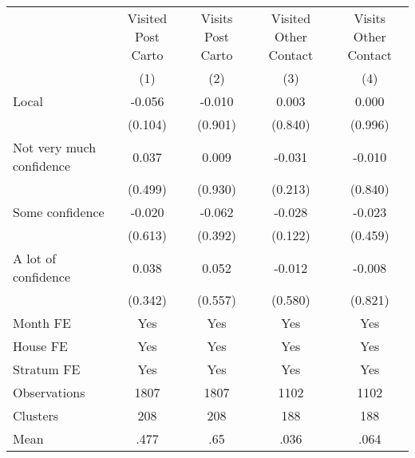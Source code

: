 {
\def\sym#1{\ifmmode^{#1}\else\(^{#1}\)\fi}
\begin{tabular}{l*{4}{c}}
\toprule
                &\multicolumn{1}{c}{Visited Post Carto}&\multicolumn{1}{c}{Visits Post Carto}&\multicolumn{1}{c}{Visited Other Contact}&\multicolumn{1}{c}{Visits Other Contact}\\
                &\multicolumn{1}{c}{(1)}         &\multicolumn{1}{c}{(2)}         &\multicolumn{1}{c}{(3)}         &\multicolumn{1}{c}{(4)}         \\
\midrule
Local           &   -0.056         &   -0.010         &    0.003         &    0.000         \\
                &  (0.104)         &  (0.901)         &  (0.840)         &  (0.996)         \\
Not very much confidence&    0.037         &    0.009         &   -0.031         &   -0.010         \\
                &  (0.499)         &  (0.930)         &  (0.213)         &  (0.840)         \\
Some confidence &   -0.020         &   -0.062         &   -0.028         &   -0.023         \\
                &  (0.613)         &  (0.392)         &  (0.122)         &  (0.459)         \\
A lot of confidence&    0.038         &    0.052         &   -0.012         &   -0.008         \\
                &  (0.342)         &  (0.557)         &  (0.580)         &  (0.821)         \\
Month FE        &      Yes         &      Yes         &      Yes         &      Yes         \\
House FE        &      Yes         &      Yes         &      Yes         &      Yes         \\
Stratum FE      &      Yes         &      Yes         &      Yes         &      Yes         \\
\midrule
Observations    &     1807         &     1807         &     1102         &     1102         \\
Clusters        &      208         &      208         &      188         &      188         \\
Mean            &     .477         &      .65         &     .036         &     .064         \\
\bottomrule
\end{tabular}
}
